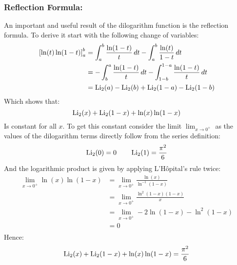 \subsubsection{Reflection Formula:}
An important and useful result of the dilogarithm function is the reflection formula.
To derive it start with the following change of variables:
\[\begin{aligned}
	\left[\ln(t)\ln(1-t)\right]_a^b &= \int_a^b\frac{\ln(1-t)}{t}\,dt-\int_a^b\frac{\ln(t)}{1-t}\,dt\\
	&=-\int_b^a\frac{\ln(1-t)}{t}\,dt-\int_{1-b}^{1-a}\frac{\ln(1-t)}{t}\,dt\\
	&=\operatorname{Li}_2(a)-\operatorname{Li}_2(b)+\operatorname{Li}_2(1-a)-\operatorname{Li}_2(1-b)\\
\end{aligned}\]
Which shows that:
\[\operatorname{Li}_2(x)+\operatorname{Li}_2(1-x)+\ln(x)\ln(1-x)\]
Is constant for all $x$.
To get this constant consider the limit $\lim_{x\rightarrow 0^+}$ as the values of the dilogarithm terms directly follow from the series definition:
\[\operatorname{Li}_2(0) = 0\quad\quad\operatorname{Li}_2(1) = \frac{\pi^2}{6}\]
And the logarithmic product is given by applying L'Hôpital's rule twice:
\[\begin{aligned}
	\lim_{x\rightarrow 0^+}\ln(x)\ln(1-x) &=\lim_{x\rightarrow 0^+}\frac{\ln(x)}{\ln^{-1}(1-x)}\\
	&=\lim_{x\rightarrow 0^+}\frac{\ln^2(1-x)(1-x)}{x}\\
	&=\lim_{x\rightarrow 0^+}-2\ln(1-x)-\ln^2(1-x)\\
	&=0\\
\end{aligned}\]
Hence:
\[\operatorname{Li}_2(x)+\operatorname{Li}_2(1-x)+\ln(x)\ln(1-x) = \frac{\pi^2}{6}\]

